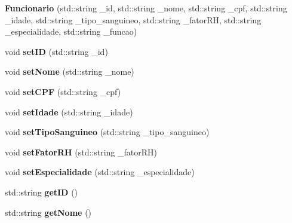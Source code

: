 \begin{DoxyCompactItemize}
\item 
\mbox{\label{classFuncionario_a600d73bb607ec21e94050eb09967dc3a}} 
{\bfseries Funcionario} (std\+::string \+\_\+id, std\+::string \+\_\+nome, std\+::string \+\_\+cpf, std\+::string \+\_\+idade, std\+::string \+\_\+tipo\+\_\+sanguineo, std\+::string \+\_\+fator\+RH, std\+::string \+\_\+especialidade, std\+::string \+\_\+funcao)
\item 
\mbox{\label{classFuncionario_a851eb221b3725471ccffe576fc268780}} 
void {\bfseries set\+ID} (std\+::string \+\_\+id)
\item 
\mbox{\label{classFuncionario_abbea04f5d58470005b8eef8702aefe7a}} 
void {\bfseries set\+Nome} (std\+::string \+\_\+nome)
\item 
\mbox{\label{classFuncionario_a1de87beb63644d6eaf01a760329556b2}} 
void {\bfseries set\+C\+PF} (std\+::string \+\_\+cpf)
\item 
\mbox{\label{classFuncionario_a7536e578810b4816b37a329d2323b8a0}} 
void {\bfseries set\+Idade} (std\+::string \+\_\+idade)
\item 
\mbox{\label{classFuncionario_a67503361a14954680bc6a20024516331}} 
void {\bfseries set\+Tipo\+Sanguineo} (std\+::string \+\_\+tipo\+\_\+sanguineo)
\item 
\mbox{\label{classFuncionario_a6b565d63121fe52013a8368c8554188a}} 
void {\bfseries set\+Fator\+RH} (std\+::string \+\_\+fator\+RH)
\item 
\mbox{\label{classFuncionario_a33d68dffd2c432a04c3f3e1c6b3d969b}} 
void {\bfseries set\+Especialidade} (std\+::string \+\_\+especialidade)
\item 
\mbox{\label{classFuncionario_a1f2c33c1db147ceb8d1b8c7e0694e168}} 
std\+::string {\bfseries get\+ID} ()
\item 
\mbox{\label{classFuncionario_a35376709ae5c7357e79ca612a74e7f15}} 
std\+::string {\bfseries get\+Nome} ()

\end{DoxyCompactItemize}
